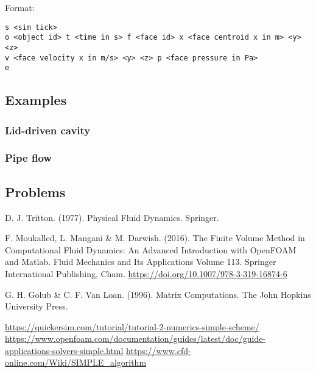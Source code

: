 \documentclass[12pt]{article}
\begin{document}
Format:

\begin{verbatim}
s <sim tick>
o <object id> t <time in s> f <face id> x <face centroid x in m> <y> <z> 
v <face velocity x in m/s> <y> <z> p <face pressure in Pa>
e
\end{verbatim}

\subsection{Examples}

\subsubsection{Lid-driven cavity}

\subsubsection{Pipe flow}

\subsection{Problems}

\begin{thebibliography}{9}
   D. J. Tritton. (1977). Physical Fluid Dynamics. Springer.
  
 F. Moukalled, L. Mangani \& M. Darwish. (2016). The Finite Volume Method in Computational Fluid Dynamics: An Advanced Introduction with OpenFOAM and Matlab. Fluid Mechanics and Its Applications Volume 113. Springer International Publishing, Cham. \url{https://doi.org/10.1007/978-3-319-16874-6}

   G. H. Golub \& C. F. Van Loan. (1996). Matrix Computations. The John Hopkins University Press.
  
 \url{https://quickersim.com/tutorial/tutorial-2-numerics-simple-scheme/}
 \url{https://www.openfoam.com/documentation/guides/latest/doc/guide-applications-solvers-simple.html}
 \url{https://www.cfd-online.com/Wiki/SIMPLE_algorithm}

\end{thebibliography}
\end{document}
